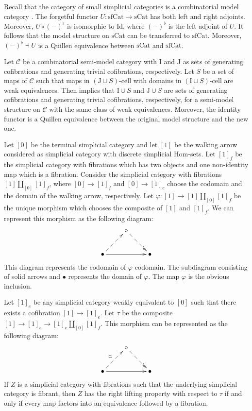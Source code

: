 \documentclass[reqno]{amsart}
\theoremstyle{definition}
\theoremstyle{remark}
\newcommand{\fs}[1]{\mathrm{#1}}
\newcommand{\Hom}{\fs{Hom}}
\newcommand{\cat}[1]{\mathcal{#1}}
\newcommand{\C}{\cat{C}}
\newcommand{\Id}{\fs{Id}}
\newcommand{\sCat}{\fs{sCat}}
\newcommand{\sfCat}{\fs{sfCat}}
\newcommand{\I}{\fs{I}}
\newcommand{\J}{\fs{J}}
\newcommand{\class}[2]{#1\text{-}\mathrm{#2}}
\newcommand{\Icell}[1][\I]{\class{#1}{cell}}
\numberwithin{figure}{section}
\begin{document}
Recall that the category of small simplicial categories is a combinatorial model category \cite[Proposition~A.3.2.4]{lurie-topos}.
The forgetful functor $U : \sfCat \to \sCat$ has both left and right adjoints.
Moreover, $U \circ (-)^\flat$ is isomorphic to $\Id$, where $(-)^\flat$ is the left adjoint of $U$.
It follows that the model structure on $\sCat$ can be transferred to $\sfCat$.
Moreover, $(-)^\flat \dashv U$ is a Quillen equivalence between $\sCat$ and $\sfCat$.

Let $\C$ be a combinatorial semi-model category with $\I$ and $\J$ as sets of generating cofibrations and generating trivial cofibrations, respectively.
Let $S$ be a set of maps of $\C$ such that maps in $\Icell[(\J \cup S)]$ with domains in $\Icell[(\I \cup S)]$ are weak equivalences.
Then  implies that $\I \cup S$ and $\J \cup S$ are sets of generating cofibrations and generating trivial cofibrations, respectively, for a semi-model structure on $\C$ with the same class of weak equivalences.
Moreover, the identity functor is a Quillen equivalence between the original model structure and the new one.

Let $[0]$ be the terminal simplicial category and let $[1]$ be the walking arrow considered as simplicial category with discrete simplicial $\Hom$-sets.
Let $[1]_f$ be the simplicial category with fibrations which has two objects and one non-identity map which is a fibration.
Consider the simplicial category with fibrations $[1] \amalg_{[0]} [1]_f$, where $[0] \to [1]_f$ and $[0] \to [1]_e$ choose the codomain and the domain of the walking arrow, respectively.
Let $\varphi : [1] \to [1] \amalg_{[0]} [1]_f$ be the unique morphism which chooses the composite of $[1]$ and $[1]_f$.
We can represent this morphism as the following diagram:
\[ \xymatrix{                               & \circ \ar@{-->>}[dr] & \\
              \bullet \ar@{-->}[ur] \ar[rr] &                      & \bullet
            } \]
This diagram represents the codomain of $\varphi$ codomain.
The subdiagram consisting of solid arrows and $\bullet$ represents the domain of $\varphi$.
The map $\varphi$ is the obvious inclusion.

Let $[1]_e$ be any simplicial category weakly equivalent to $[0]$ such that there exists a cofibration $[1] \to [1]_e$.
Let $\tau$ be the composite $[1] \to [1]_e \to [1]_e \amalg_{[0]} [1]_f$.
This morphism can be represented as the following diagram:
\[ \xymatrix{                                        & \circ \ar@{-->>}[dr] & \\
              \bullet \ar@{-->}[ur]^{\simeq} \ar[rr] &                      & \bullet
            } \]
If $Z$ is a simplicial category with fibrations such that the underlying simplicial category is fibrant,
then $Z$ has the right lifting property with respect to $\tau$ if and only if every map factors into an equivalence followed by a fibration.
\end{document}
